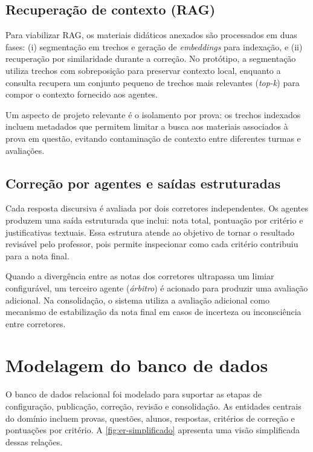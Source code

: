\subsection{Recuperação de contexto (RAG)}

Para viabilizar RAG, os materiais didáticos anexados são processados em duas fases: (i) segmentação em trechos e geração de \textit{embeddings} para indexação, e (ii) recuperação por similaridade durante a correção. No protótipo, a segmentação utiliza trechos com sobreposição para preservar contexto local, enquanto a consulta recupera um conjunto pequeno de trechos mais relevantes (\textit{top-k}) para compor o contexto fornecido aos agentes.

Um aspecto de projeto relevante é o isolamento por prova: os trechos indexados incluem metadados que permitem limitar a busca aos materiais associados à prova em questão, evitando contaminação de contexto entre diferentes turmas e avaliações.

\subsection{Correção por agentes e saídas estruturadas}

Cada resposta discursiva é avaliada por dois corretores independentes. Os agentes produzem uma saída estruturada que inclui: nota total, pontuação por critério e justificativas textuais. Essa estrutura atende ao objetivo de tornar o resultado revisável pelo professor, pois permite inspecionar como cada critério contribuiu para a nota final.

Quando a divergência entre as notas dos corretores ultrapassa um limiar configurável, um terceiro agente (\textit{árbitro}) é acionado para produzir uma avaliação adicional. Na consolidação, o sistema utiliza a avaliação adicional como mecanismo de estabilização da nota final em casos de incerteza ou inconsciência entre corretores.

\section{Modelagem do banco de dados}

O banco de dados relacional foi modelado para suportar as etapas de configuração, publicação, correção, revisão e consolidação. As entidades centrais do domínio incluem provas, questões, alunos, respostas, critérios de correção e pontuações por critério. A \autoref{fig:er-simplificado} apresenta uma visão simplificada dessas relações.

